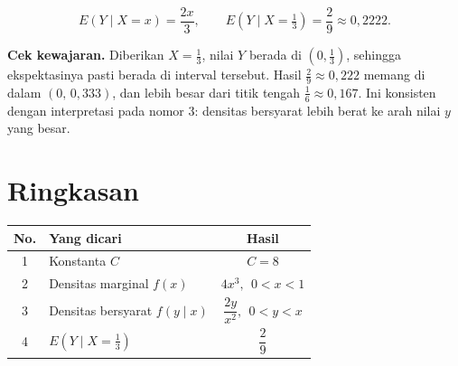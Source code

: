 \documentclass[11pt,a4paper]{article}
\begin{document}
\begin{jawaban}
\[
E(Y\mid X=x)=\frac{2x}{3},\qquad
E\!\left(Y\mid X=\tfrac13\right)=\frac{2}{9}\approx 0{,}2222.
\]
\end{jawaban}

\begin{catatan}
\textbf{Cek kewajaran.} Diberikan $X=\tfrac13$, nilai $Y$ berada di $(0,\tfrac13)$, sehingga ekspektasinya pasti berada di interval tersebut. Hasil $\tfrac29\approx0{,}222$ memang di dalam $(0,\,0{,}333)$, dan lebih besar dari titik tengah $\tfrac16\approx0{,}167$. Ini konsisten dengan interpretasi pada nomor 3: densitas bersyarat lebih berat ke arah nilai $y$ yang besar.
\end{catatan}

\section*{Ringkasan}

\begin{center}
\renewcommand{\arraystretch}{1.8}
\begin{tabular}{|c|l|c|}
\hline
\textbf{No.} & \textbf{Yang dicari} & \textbf{Hasil} \\
\hline
1 & Konstanta $C$ & $C=8$ \\
\hline
2 & Densitas marginal $f(x)$ & $4x^3,\ \ 0<x<1$ \\
\hline
3 & Densitas bersyarat $f(y\mid x)$ & $\dfrac{2y}{x^2},\ \ 0<y<x$ \\
\hline
4 & $E\!\left(Y\mid X=\tfrac13\right)$ & $\dfrac{2}{9}$ \\
\hline
\end{tabular}
\end{center}
\end{document}
